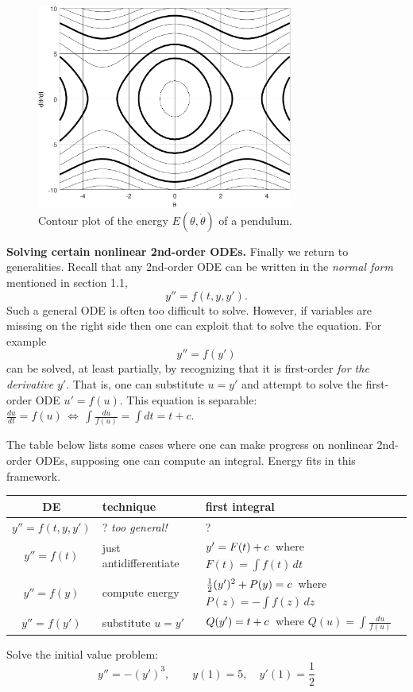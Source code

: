 \documentclass[12pt]{article}
\theoremstyle{definition}
\begin{document}
\begin{figure}[h]
\begin{center}
\includegraphics[width=0.75\textwidth]{pendulumcurves}
\end{center}

\vspace{-5mm}
\caption{Contour plot of the energy $E(\theta,\dot\theta)$ of a pendulum.}
\end{figure}

\medskip
\textbf{Solving certain nonlinear 2nd-order ODEs.}  Finally we return to generalities.  Recall that any 2nd-order ODE can be written in the \emph{normal form} mentioned in section 1.1,
    $$y'' = f(t,y,y').$$
Such a general ODE is often too difficult to solve.  However, if variables are missing on the right side then one can exploit that to solve the equation.  For example
    $$y'' = f(y')$$
can be solved, at least partially, by recognizing that it is first-order \emph{for the derivative} $y'$.  That is, one can substitute $u=y'$ and attempt to solve the first-order ODE $u'=f(u)$.  This equation is separable: \, $\frac{du}{dt} = f(u) \, \iff \, \int \frac{du}{f(u)} = \int dt = t + c$.

The table below lists some cases where one can make progress on nonlinear 2nd-order ODEs, supposing one can compute an integral.  Energy fits in this framework.

\medskip
\begin{tabular}{c|l|l}
DE & technique & first integral \\ \hline \hline
$y'' = f(t,y,y')$ & ? \quad \emph{too general!} & ? \\ \hline
$y'' = f(t)$ & just antidifferentiate & $y' = F(t)+c \large\strut$\, where $F(t) = \int f(t)\,dt$ \\ \hline
$y'' = f(y)$ & compute energy & $\frac{1}{2} (y')^2 + P(y) = c \large\strut$\, where $P(z) = -\int f(z)\,dz$ \\ \hline
$y'' = f(y')$ & substitute $u=y'$ & $Q(y') = t + c \large\strut$\, where $Q(u)=\int \frac{du}{f(u)}$
\end{tabular}

\medskip
\begin{exerpart}
Solve the initial value problem:
    $$y'' = - (y')^3, \qquad y(1)=5, \quad y'(1)=\frac{1}{2}$$
\end{exerpart}
\end{document}
